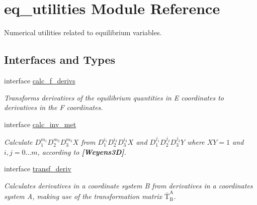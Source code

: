 \hypertarget{namespaceeq__utilities}{}\section{eq\+\_\+utilities Module Reference}
\label{namespaceeq__utilities}


Numerical utilities related to equilibrium variables.  


\subsection*{Interfaces and Types}
\begin{DoxyCompactItemize}
\item 
interface \hyperlink{interfaceeq__utilities_1_1calc__f__derivs}{calc\+\_\+f\+\_\+derivs}
\begin{DoxyCompactList}\small\item\em Transforms derivatives of the equilibrium quantities in E coordinates to derivatives in the F coordinates. \end{DoxyCompactList}\item 
interface \hyperlink{interfaceeq__utilities_1_1calc__inv__met}{calc\+\_\+inv\+\_\+met}
\begin{DoxyCompactList}\small\item\em Calculate $D_1^{m_1} D_2^{m_2} D_3^{m_3} X$ from $D_1^{i_1} D_2^{i_2} D_3^{i_3} X$ and $D_1^{j_1} D_2^{j_2} D_3^{j_3} Y$ where $XY=1$ and $i,j = 0\ldots m$, according to {\bfseries [Weyens3D]}. \end{DoxyCompactList}\item 
interface \hyperlink{interfaceeq__utilities_1_1transf__deriv}{transf\+\_\+deriv}
\begin{DoxyCompactList}\small\item\em Calculates derivatives in a coordinate system B from derivatives in a coordinates system A, making use of the transformation matrix $\overline{\text{T}}_\text{B}^\text{A}$. \end{DoxyCompactList}\end{DoxyCompactItemize}
